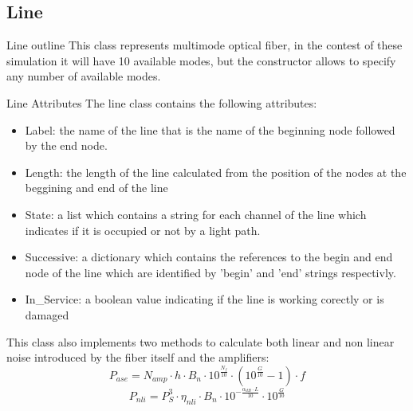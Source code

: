 \documentclass{beamer}
\begin{document}
	\subsection{Line}
	\begin{frame}{Line outline}
		This class represents multimode optical fiber, in the contest of these simulation it will have 10 available modes, but the constructor allows to specify any number of available modes.
	\end{frame}
	\begin{frame}{Line Attributes}
		The line class contains the following attributes:
		\begin{itemize}
			\item Label: the name of the line that is the name of the beginning node followed by the end node.
			\item Length: the length of the line calculated from the position of the nodes at the beggining and end of the line
			\item State: a list which contains a string for each channel of the line which indicates if it is occupied or not by a light path.
			\item  Successive: a dictionary which contains the references to the begin and end node of the line which are identified by 'begin' and 'end' strings respectivly.
			\item In\_Service: a boolean value indicating if the line is working corectly or is damaged
		\end{itemize}
	\end{frame}
	\begin{frame}
		This class also implements two methods to calculate both linear and non linear noise introduced by the fiber itself and the amplifiers: \pause
		\begin{equation} %
			P_{ase} = N_{amp} \cdot h \cdot B_n \cdot 10^{\frac{N_f}{10}} \cdot \left(10^{\frac{G}{10}} - 1 \right) \cdot f 
			\label{eq:P_ase}
		\end{equation} \pause
		\begin{equation}
			P_{nli} = P_{S}^3 \cdot \eta_{nli} \cdot B_n \cdot 10^{-\frac{\alpha_{dB} \cdot L}{10}} \cdot 10^{\frac{G}{10}}
			\label{eq:P_nli}
		\end{equation}
	\end{frame}
\end{document}
